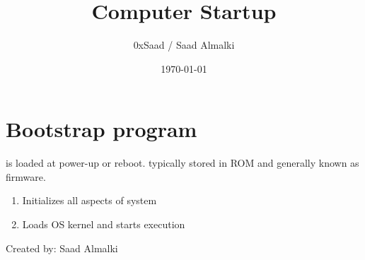 \documentclass[12pt]{article}
\title{Computer Startup}
\author{0xSaad / Saad Almalki}
\date{\today}
\begin{document}
\maketitle

\section{Bootstrap program}
is loaded at power-up or reboot. typically stored in ROM and generally known as firmware.
\begin{enumerate}
  \item Initializes all aspects of system
  \item Loads OS kernel and starts execution
\end{enumerate}

\begin{flushright}
Created by: Saad Almalki \\
\end{flushright}
\end{document}
